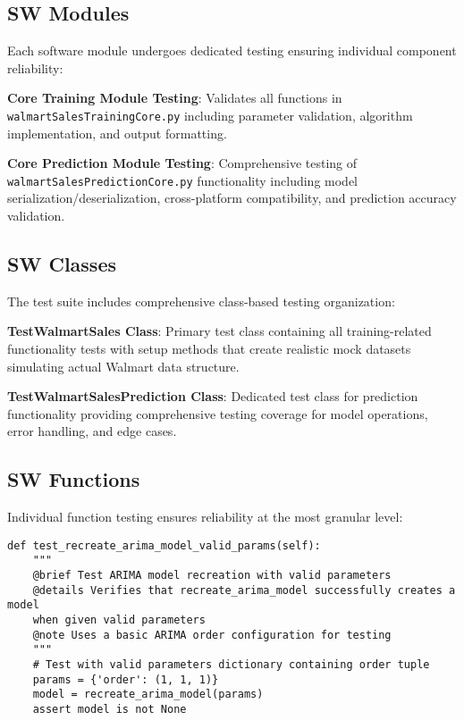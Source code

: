 \subsection{SW Modules}

Each software module undergoes dedicated testing ensuring individual component reliability:

\textbf{Core Training Module Testing}: Validates all functions in \texttt{walmartSalesTrainingCore.py} including parameter validation, algorithm implementation, and output formatting.

\textbf{Core Prediction Module Testing}: Comprehensive testing of \texttt{walmartSalesPredictionCore.py} functionality including model serialization/deserialization, cross-platform compatibility, and prediction accuracy validation.

\subsection{SW Classes}

The test suite includes comprehensive class-based testing organization:

\textbf{TestWalmartSales Class}: Primary test class containing all training-related functionality tests with setup methods that create realistic mock datasets simulating actual Walmart data structure.

\textbf{TestWalmartSalesPrediction Class}: Dedicated test class for prediction functionality providing comprehensive testing coverage for model operations, error handling, and edge cases.

\subsection{SW Functions}

Individual function testing ensures reliability at the most granular level:

\begin{lstlisting}[language=MyPython, caption={Example Function Test}]
	def test_recreate_arima_model_valid_params(self):
	"""
	@brief Test ARIMA model recreation with valid parameters
	@details Verifies that recreate_arima_model successfully creates a model 
	when given valid parameters
	@note Uses a basic ARIMA order configuration for testing
	"""
	# Test with valid parameters dictionary containing order tuple
	params = {'order': (1, 1, 1)}
	model = recreate_arima_model(params)
	assert model is not None
\end{lstlisting}

